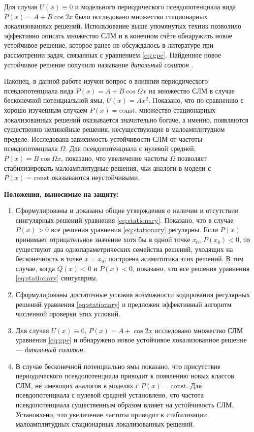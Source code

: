 \documentclass[candidate, href, colorlinks]{disser}
\begin{document}
Для случая $U(x) \equiv 0$ и модельного периодического псевдопотенциала вида $P(x) = A + B \cos 2x$ было исследовано множество стационарных локализованных решений.
Использование выше упомянутых техник позволило эффективно описать множество СЛМ и в конечном счёте обнаружить новое устойчивое решение, которое ранее не обсуждалось в литературе при рассмотрении задач, связанных с уравнением \eqref{eq:gpe}.
Найденное новое устойчивое решение получило называние {\it дипольный солитон} \cite{LebedevAlfimovMalomed}.

Наконец, в данной работе изучен вопрос о влиянии периодического псевдопотенциала вида $P(x) = A + B \cos \Omega x$ на множество СЛМ в случае бесконечной потенциальной ямы, $U(x) = A x^2$.
Показано, что по сравнению с хорошо изученным случаем $P(x) = \mathrm{const}$, множество стационарных локализованных решений оказывается значительно богаче, а именно, появляются существенно нелинейные решения, несуществующие в малоамплитудном пределе.
Исследована зависимость устойчивости СЛМ от частоты псевдопотенциала $\Omega$.
Для псевдопотенциала с нулевой средней, $P(x) = B \cos \Omega x$, показано, что увеличение частоты $\Omega$ позволяет стабилизировать малоамплитудные решения, чьи аналоги в модели с $P(x) = \mathrm{const}$ оказываются неустойчивыми.


\textbf{Положения, выносимые на защиту:}
\begin{enumerate}
	\item Сформулированы и доказаны общие утверждения о наличии и отсутствии сингулярных решений уравнения \eqref{eq:stationary}.
		Показано, что в случае $P(x) > 0$ все решения уравнения \eqref{eq:stationary} регулярны.
		Если $P(x)$ принимает отрицательное значение хотя бы в одной точке $x_0$, $P(x_0) < 0$, то существуют два однопараметрических семейства решений, уходящих на бесконечность в точке $x = x_0$; построена асимптотика этих решений. 
		В том случае, когда $Q(x) < 0$ и $P(x) < 0$, показано, что все решения уравнения \eqref{eq:stationary} сингулярны.
	\item Сформулированы достаточные условия возможности кодирования регулярных решений уравнения \eqref{eq:stationary} и предложен эффективный алгоритм численной проверки этих условий.
	\item Для случая $U(x) \equiv 0$, $P(x) = A + \cos 2x$ исследовано множество СЛМ уравнения \eqref{eq:gpe} и обнаружено новое устойчивое локализованное решение --- {\it дипольный солитон}.
	\item В случае бесконечной потенциально ямы показано, что присутствие периодического псевдопотенциала приводит к появлению новых классов СЛМ, не имеющих аналогов в моделях с $P(x) = \mathrm{const}$.
		Для псевдопотенциала с нулевой средней установлено, что частота псевдопотенциала существенным образом влияет на устойчивость СЛМ.
		Установлено, что увеличение частоты приводит к стабилизации малоамплитудных стационарных локализованных решений.
\end{enumerate}
\end{document}
